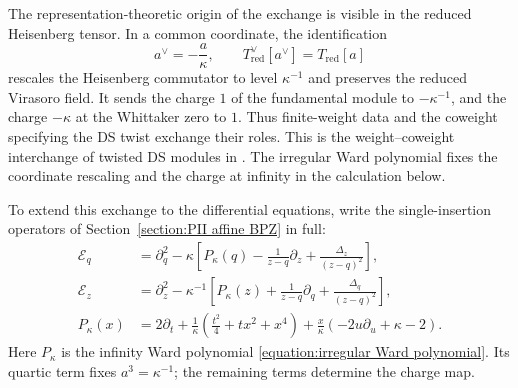 \documentclass[a4paper,11pt]{article}
\numberwithin{equation}{section}
\begin{document}
The representation-theoretic origin of the exchange is visible in the
reduced Heisenberg tensor.  In a common coordinate,
the identification
\begin{equation}
	\label{equation:PII Langlands reduced Heisenberg exchange}
	a^{\vee}=-\frac{a}{\kappa},
	\qquad
	T_{\mathrm{red}}^{\vee}[a^{\vee}]=T_{\mathrm{red}}[a]
\end{equation}
rescales the Heisenberg commutator to level $\kappa^{-1}$ and
preserves the reduced Virasoro field.  It sends the charge $1$ of
the fundamental module to $-\kappa^{-1}$, and the charge $-\kappa$
at the Whittaker zero to $1$.  Thus finite-weight data and the
coweight specifying the DS twist exchange their roles.  This is the
weight--coweight interchange of twisted DS modules in
\cite{ArakawaFrenkel2019}.
The irregular Ward polynomial fixes the coordinate rescaling and
the charge at infinity in the calculation below.

To extend this exchange to the differential equations, write the
single-insertion operators of Section~\ref{section:PII affine BPZ} in full:
\begin{equation}
	\begin{aligned}
		\mathcal{E}_{q}
		&=\partial_{q}^{2}-\kappa\left[
		P_{\kappa}(q)-\frac{1}{z-q}\partial_{z}
		+\frac{\Delta_{z}}{(z-q)^{2}}\right],\\
		\mathcal{E}_{z}
		&=\partial_{z}^{2}-\kappa^{-1}\left[
		P_{\kappa}(z)+\frac{1}{z-q}\partial_{q}
		+\frac{\Delta_{q}}{(z-q)^{2}}\right],\\
		P_{\kappa}(x)
		&=2\partial_{t}+\frac{1}{\kappa}
		\left(\frac{t^{2}}{4}+tx^{2}+x^{4}\right)
		+\frac{x}{\kappa}(-2u\partial_{u}+\kappa-2).
	\end{aligned}
\end{equation}
Here $P_{\kappa}$ is the infinity Ward polynomial
\eqref{equation:irregular Ward polynomial}.  Its quartic term fixes
$a^{3}=\kappa^{-1}$; the remaining terms determine the charge map.
\end{document}
